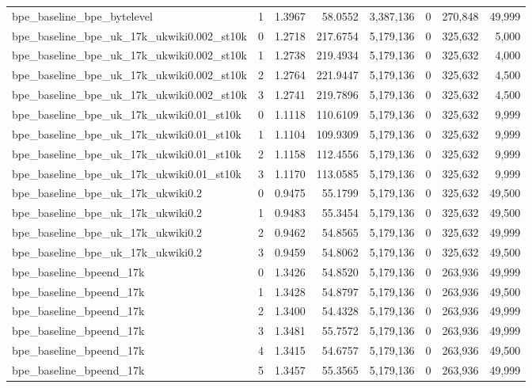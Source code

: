 \begin{tabular}{lrrrrrrr}
bpe\_baseline\_bpe\_bytelevel & 1 & 1.3967 & 58.0552 & 3,387,136 & 0 & 270,848 & 49,999 \\
bpe\_baseline\_bpe\_uk\_17k\_ukwiki0.002\_st10k & 0 & 1.2718 & 217.6754 & 5,179,136 & 0 & 325,632 & 5,000 \\
bpe\_baseline\_bpe\_uk\_17k\_ukwiki0.002\_st10k & 1 & 1.2738 & 219.4934 & 5,179,136 & 0 & 325,632 & 4,000 \\
bpe\_baseline\_bpe\_uk\_17k\_ukwiki0.002\_st10k & 2 & 1.2764 & 221.9447 & 5,179,136 & 0 & 325,632 & 4,500 \\
bpe\_baseline\_bpe\_uk\_17k\_ukwiki0.002\_st10k & 3 & 1.2741 & 219.7896 & 5,179,136 & 0 & 325,632 & 4,500 \\
bpe\_baseline\_bpe\_uk\_17k\_ukwiki0.01\_st10k & 0 & 1.1118 & 110.6109 & 5,179,136 & 0 & 325,632 & 9,999 \\
bpe\_baseline\_bpe\_uk\_17k\_ukwiki0.01\_st10k & 1 & 1.1104 & 109.9309 & 5,179,136 & 0 & 325,632 & 9,999 \\
bpe\_baseline\_bpe\_uk\_17k\_ukwiki0.01\_st10k & 2 & 1.1158 & 112.4556 & 5,179,136 & 0 & 325,632 & 9,999 \\
bpe\_baseline\_bpe\_uk\_17k\_ukwiki0.01\_st10k & 3 & 1.1170 & 113.0585 & 5,179,136 & 0 & 325,632 & 9,999 \\
bpe\_baseline\_bpe\_uk\_17k\_ukwiki0.2 & 0 & 0.9475 & 55.1799 & 5,179,136 & 0 & 325,632 & 49,500 \\
bpe\_baseline\_bpe\_uk\_17k\_ukwiki0.2 & 1 & 0.9483 & 55.3454 & 5,179,136 & 0 & 325,632 & 49,500 \\
bpe\_baseline\_bpe\_uk\_17k\_ukwiki0.2 & 2 & 0.9462 & 54.8565 & 5,179,136 & 0 & 325,632 & 49,999 \\
bpe\_baseline\_bpe\_uk\_17k\_ukwiki0.2 & 3 & 0.9459 & 54.8062 & 5,179,136 & 0 & 325,632 & 49,500 \\
bpe\_baseline\_bpeend\_17k & 0 & 1.3426 & 54.8520 & 5,179,136 & 0 & 263,936 & 49,999 \\
bpe\_baseline\_bpeend\_17k & 1 & 1.3428 & 54.8797 & 5,179,136 & 0 & 263,936 & 49,500 \\
bpe\_baseline\_bpeend\_17k & 2 & 1.3400 & 54.4328 & 5,179,136 & 0 & 263,936 & 49,999 \\
bpe\_baseline\_bpeend\_17k & 3 & 1.3481 & 55.7572 & 5,179,136 & 0 & 263,936 & 49,999 \\
bpe\_baseline\_bpeend\_17k & 4 & 1.3415 & 54.6757 & 5,179,136 & 0 & 263,936 & 49,500 \\
bpe\_baseline\_bpeend\_17k & 5 & 1.3457 & 55.3565 & 5,179,136 & 0 & 263,936 & 49,999 \\

\end{tabular}
